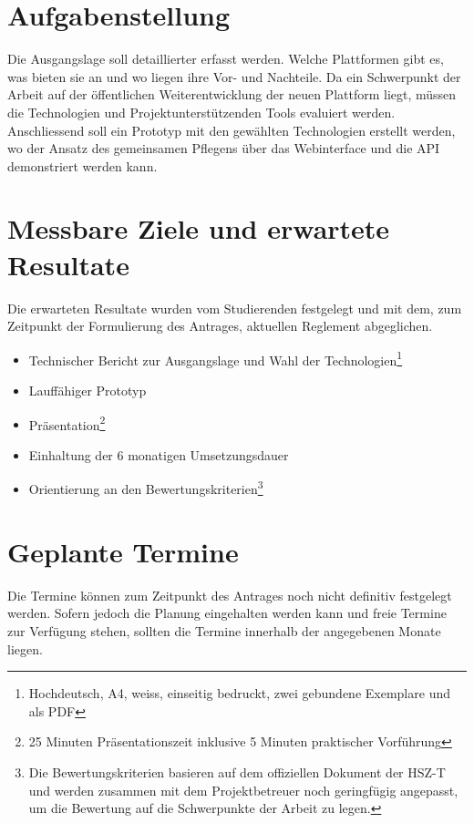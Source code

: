 \documentclass[]{scrreprt}
\begin{document}
    \section{Aufgabenstellung}
    Die Ausgangslage soll detaillierter erfasst werden. Welche Plattformen
    gibt es, was bieten sie an und wo liegen ihre Vor- und Nachteile.
    Da ein Schwerpunkt der Arbeit auf der öffentlichen Weiterentwicklung der
    neuen Plattform liegt, müssen die Technologien und Projektunterstützenden 
    Tools evaluiert werden.
    Anschliessend soll ein Prototyp mit den gewählten Technologien erstellt
    werden, wo der Ansatz des gemeinsamen Pflegens über das Webinterface und 
    die API demonstriert werden kann.
    
    \newpage

    \section{Messbare Ziele und erwartete Resultate}
    Die erwarteten Resultate wurden vom Studierenden festgelegt und mit dem, 
    zum Zeitpunkt der Formulierung des Antrages, aktuellen 
    Reglement\cite{reglement} abgeglichen.
    
    \begin{itemize}
        \item Technischer Bericht zur Ausgangslage und Wahl der 
            Technologien\footnote{Hochdeutsch, A4, weiss, einseitig 
    	    bedruckt, zwei gebundene Exemplare und als PDF}
    	\item Lauffähiger Prototyp
        \item Präsentation\footnote{25 Minuten Präsentationszeit inklusive 5 
            Minuten praktischer Vorführung}
        \item Einhaltung der 6 monatigen Umsetzungsdauer
        \item Orientierung an den Bewertungskriterien\footnote{Die 
            Bewertungskriterien basieren auf dem offiziellen 
            Dokument\cite{bewertungskriterien} der HSZ-T und werden zusammen 
            mit dem Projektbetreuer noch geringfügig angepasst, um die
            Bewertung auf die Schwerpunkte der Arbeit zu legen.}
    \end{itemize}

    \section{Geplante Termine}
    Die Termine können zum Zeitpunkt des Antrages noch nicht definitiv 
    festgelegt werden. Sofern jedoch die Planung eingehalten werden kann und 
    freie Termine zur Verfügung stehen, sollten die Termine innerhalb der 
    angegebenen Monate liegen.
\end{document}
